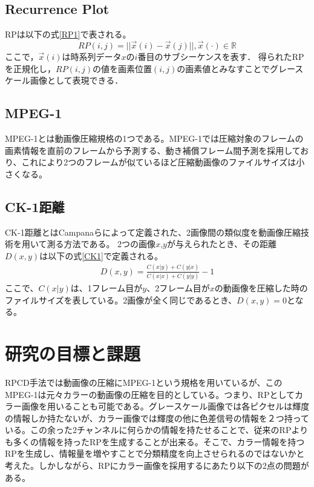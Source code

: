 \documentclass{cssotsuken}
\begin{document}
\subsection{Recurrence Plot}

RPは以下の式\ref{RP1}で表される。
\begin{equation}
\label{RP1}
RP(i,j)=||\vec{x}(i)-\vec{x}(j)||, \vec{x}(\cdot)\in\mathbb{R}
\end{equation}
ここで，$\vec{x}(i)$は時系列データ$x$の$i$番目のサブシーケンスを表す．
得られたRPを正規化し，$RP(i,j)$の値を画素位置$(i,j)$の画素値とみなすことでグレースケール画像として表現できる．

\subsection{MPEG-1}
MPEG-1とは動画像圧縮規格の1つである。MPEG-1では圧縮対象のフレームの画素情報を直前のフレームから予測する、動き補償フレーム間予測を採用しており、これにより2つのフレームが似ているほど圧縮動画像のファイルサイズは小さくなる。

\subsection{CK-1距離}
CK-1距離とはCampanaらによって定義された、2画像間の類似度を動画像圧縮技術を用いて測る方法である。\cite{ck1} 2つの画像$x$,$y$が与えられたとき、その距離$D(x,y)$は以下の式\ref{CK1}で定義される。
\begin{eqnarray}
\label{CK1}
D(x,y)=\frac{C(x|y)+C(y|x)}{C(x|x)+C(y|y)}-1
\end{eqnarray}
ここで、$C(x|y)$は、1フレーム目が$y$、2フレーム目が$x$の動画像を圧縮した時のファイルサイズを表している。2画像が全く同じであるとき、$D(x,y)=0$となる。

\section{研究の目標と課題}
RPCD手法では動画像の圧縮にMPEG-1という規格を用いているが、このMPEG-1は元々カラーの動画像の圧縮を目的としている。つまり、RPとしてカラー画像を用いることも可能である。グレースケール画像では各ピクセルは輝度の情報しか持たないが、カラー画像では輝度の他に色差信号の情報を２つ持っている。この余った2チャンネルに何らかの情報を持たせることで、従来のRPよりも多くの情報を持ったRPを生成することが出来る。そこで、カラー情報を持つRPを生成し、情報量を増やすことで分類精度を向上させられるのではないかと考えた。しかしながら、RPにカラー画像を採用するにあたり以下の2点の問題がある。
\end{document}
